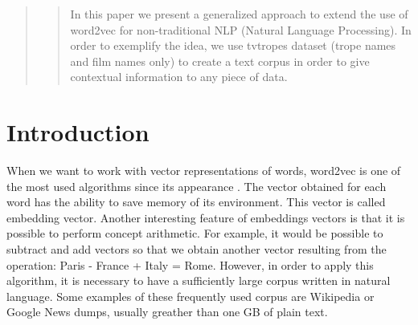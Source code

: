 \documentclass[letterpaper]{article}
\begin{document}
 
	\begin{abstract}
		\begin{quote}
			In this paper we present a generalized approach to extend the use of word2vec for non-traditional NLP (Natural Language Processing). In order to exemplify the idea, we use tvtropes dataset (trope names and film names only) to create a text corpus in order to give contextual information to any piece of data.
		\end{quote}
	\end{abstract}
	
	
	
	
	
	\section{Introduction}
	
	

 
    When we want to work with vector representations of words, word2vec is one of the most used algorithms since its appearance \cite{mikolov2013}.
    The vector obtained for each word has the ability to save memory of its environment. This vector is called embedding vector.
    Another interesting feature of embeddings vectors is that it is possible to perform concept arithmetic. For example, it would be possible to subtract and add vectors so that we obtain another vector resulting from the operation: Paris - France + Italy = Rome. However, in order to apply this algorithm, it is necessary to have a sufficiently large corpus written in natural language. Some examples of these frequently used corpus are Wikipedia or Google News dumps, usually greather than one GB of plain text. \\
    
\end{document}
